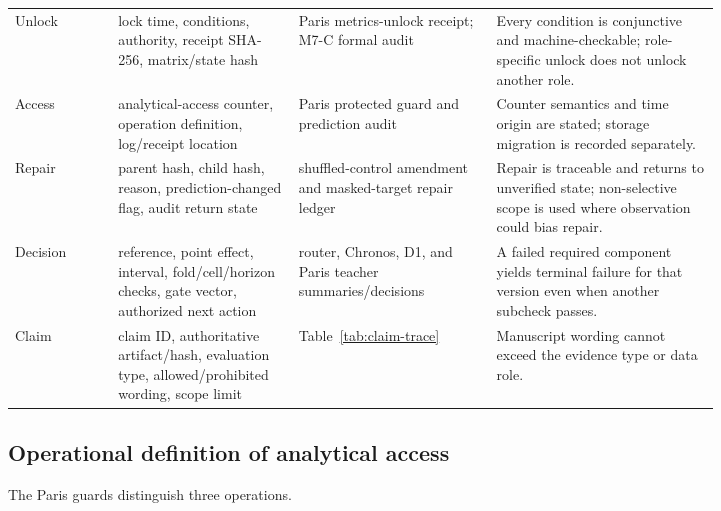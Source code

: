 \begin{table}[htbp]
\begin{tabular}{>{\raggedright\arraybackslash}p{0.12\linewidth}>{\raggedright\arraybackslash}p{0.21\linewidth}>{\raggedright\arraybackslash}p{0.23\linewidth}>{\raggedright\arraybackslash}p{0.26\linewidth}}
Unlock & lock time, conditions, authority, receipt SHA-256, matrix/state hash & Paris metrics-unlock receipt; M7-C formal audit & Every condition is conjunctive and machine-checkable; role-specific unlock does not unlock another role. \\
Access & analytical-access counter, operation definition, log/receipt location & Paris protected guard and prediction audit & Counter semantics and time origin are stated; storage migration is recorded separately. \\
Repair & parent hash, child hash, reason, prediction-changed flag, audit return state & shuffled-control amendment and masked-target repair ledger & Repair is traceable and returns to unverified state; non-selective scope is used where observation could bias repair. \\
Decision & reference, point effect, interval, fold/cell/horizon checks, gate vector, authorized next action & router, Chronos, D1, and Paris teacher summaries/decisions & A failed required component yields terminal failure for that version even when another subcheck passes. \\
Claim & claim ID, authoritative artifact/hash, evaluation type, allowed/prohibited wording, scope limit & Table~\ref{tab:claim-trace} & Manuscript wording cannot exceed the evidence type or data role. \\
\bottomrule
\end{tabular}
\end{table}

\FloatBarrier

\subsection{Operational definition of analytical access}
\label{sec:appendix-access-definition}

The Paris guards distinguish three operations.

